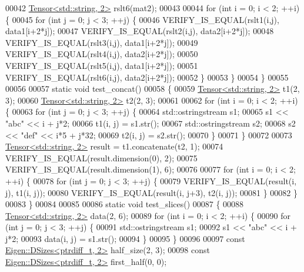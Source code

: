 \begin{DoxyCode}
00042   \hyperlink{class_eigen_1_1_tensor}{Tensor<std::string, 2>} rslt6(mat2);
00043 
00044   \textcolor{keywordflow}{for} (\textcolor{keywordtype}{int} i = 0; i < 2; ++i) \{
00045     \textcolor{keywordflow}{for} (\textcolor{keywordtype}{int} j = 0; j < 3; ++j) \{
00046       VERIFY\_IS\_EQUAL(rslt1(i,j), data1[i+2*j]);
00047       VERIFY\_IS\_EQUAL(rslt2(i,j), data2[i+2*j]);
00048       VERIFY\_IS\_EQUAL(rslt3(i,j), data1[i+2*j]);
00049       VERIFY\_IS\_EQUAL(rslt4(i,j), data2[i+2*j]);
00050       VERIFY\_IS\_EQUAL(rslt5(i,j), data1[i+2*j]);
00051       VERIFY\_IS\_EQUAL(rslt6(i,j), data2[i+2*j]);
00052     \}
00053   \}
00054 \}
00055 
00056 
00057 \textcolor{keyword}{static} \textcolor{keywordtype}{void} test\_concat()
00058 \{
00059   \hyperlink{class_eigen_1_1_tensor}{Tensor<std::string, 2>} t1(2, 3);
00060   \hyperlink{class_eigen_1_1_tensor}{Tensor<std::string, 2>} t2(2, 3);
00061 
00062   \textcolor{keywordflow}{for} (\textcolor{keywordtype}{int} i = 0; i < 2; ++i) \{
00063     \textcolor{keywordflow}{for} (\textcolor{keywordtype}{int} j = 0; j < 3; ++j) \{
00064       std::ostringstream s1;
00065       s1 << \textcolor{stringliteral}{"abc"} << i + j*2;
00066       t1(i, j) = s1.str();
00067       std::ostringstream s2;
00068       s2 << \textcolor{stringliteral}{"def"} << i*5 + j*32;
00069       t2(i, j) = s2.str();
00070     \}
00071   \}
00072 
00073   \hyperlink{class_eigen_1_1_tensor}{Tensor<std::string, 2>} result = t1.concatenate(t2, 1);
00074   VERIFY\_IS\_EQUAL(result.dimension(0), 2);
00075   VERIFY\_IS\_EQUAL(result.dimension(1), 6);
00076 
00077   \textcolor{keywordflow}{for} (\textcolor{keywordtype}{int} i = 0; i < 2; ++i) \{
00078     \textcolor{keywordflow}{for} (\textcolor{keywordtype}{int} j = 0; j < 3; ++j) \{
00079       VERIFY\_IS\_EQUAL(result(i, j),   t1(i, j));
00080       VERIFY\_IS\_EQUAL(result(i, j+3), t2(i, j));
00081     \}
00082   \}
00083 \}
00084 
00085 
00086 \textcolor{keyword}{static} \textcolor{keywordtype}{void} test\_slices()
00087 \{
00088   \hyperlink{class_eigen_1_1_tensor}{Tensor<std::string, 2>} data(2, 6);
00089   \textcolor{keywordflow}{for} (\textcolor{keywordtype}{int} i = 0; i < 2; ++i) \{
00090     \textcolor{keywordflow}{for} (\textcolor{keywordtype}{int} j = 0; j < 3; ++j) \{
00091       std::ostringstream s1;
00092       s1 << \textcolor{stringliteral}{"abc"} << i + j*2;
00093       data(i, j) = s1.str();
00094     \}
00095   \}
00096 
00097   \textcolor{keyword}{const} \hyperlink{struct_eigen_1_1_d_sizes}{Eigen::DSizes<ptrdiff\_t, 2>} half\_size(2, 3);
00098   \textcolor{keyword}{const} \hyperlink{struct_eigen_1_1_d_sizes}{Eigen::DSizes<ptrdiff\_t, 2>} first\_half(0, 0);

\end{DoxyCode}
